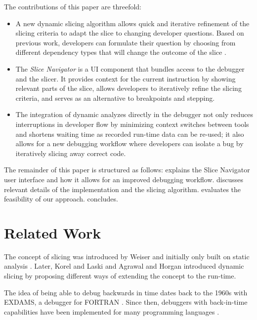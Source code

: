 ﻿\documentclass[
      english,
			conference,
      ]{IEEEtran}
\begin{document}
The contributions of this paper are threefold:
\begin{itemize}
	\item A new dynamic slicing algorithm allows quick and iterative refinement of the slicing criteria to adapt the slice to changing developer questions.
		Based on previous work, developers can formulate their question by choosing from different dependency types that will change the outcome of the slice \cite{treffer_dynamic_2014}.
	\item The \emph{Slice Navigator} is a UI component that bundles access to the debugger and the slicer.
		It provides context for the current instruction by showing relevant parts of the slice, allows developers to iteratively refine the slicing criteria, and serves as an alternative to breakpoints and stepping.
	\item The integration of dynamic analyzes directly in the debugger not only reduces interruptions in developer flow by minimizing context switches between tools and shortens waiting time as recorded run-time data can be re-used; it also allows for a new debugging workflow where developers can isolate a bug by iteratively slicing away correct code.
\end{itemize}

The remainder of this paper is structured as follows:
 explains the Slice Navigator user interface and how it allows for an improved debugging workflow.
 discusses relevant details of the implementation and the slicing algorithm.
 evaluates the feasibility of our approach.
 concludes.

\section{Related Work}

The concept of slicing was introduced by Weiser and initially only built on static analysis \cite{weiser_programmers_1982, weiser_program_1981}.
Later, Korel and Laski \cite{korel_dynamic_1990} and Agrawal and Horgan \cite{agrawal_dynamic_1990} introduced dynamic slicing by proposing different ways of extending the concept to the run-time.

The idea of being able to debug backwards in time dates back to the 1960s with EXDAMS, a debugger for FORTRAN \cite{balzer_exdams:_1969}.
Since then, debuggers with back-in-time capabilities have been implemented for many programming languages \cite{agrawal_debugging_1993, feldman_igor:_1988, lieberman_zstep_1995}.
\end{document}
